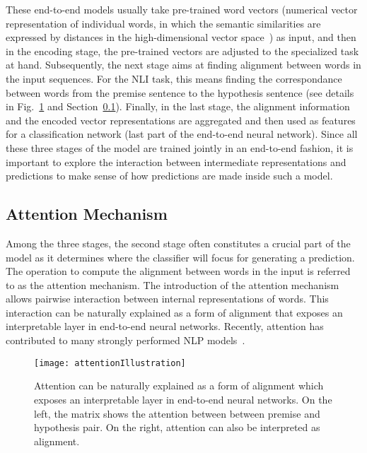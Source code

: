 These end-to-end models usually take pre-trained word vectors (numerical vector representation of individual words, in which the semantic similarities are expressed by distances in the high-dimensional vector space~\cite{MikolovSutskeverChen2013, PenningtonSocherManning2014}) as input, and then in the encoding stage, the pre-trained vectors are adjusted to the specialized task at hand. Subsequently, the next stage aims at finding alignment between words in the input sequences. For the NLI task, this means finding the correspondance between words from the premise sentence to the hypothesis sentence (see details in Fig.~\ref{fig:attention} and Section~\ref{sec:attention}). Finally, in the last stage, the alignment information and the encoded vector representations are aggregated and then used as features for a classification network (last part of the end-to-end neural network).
%
Since all these three stages of the model are trained jointly in an end-to-end fashion, it is important to explore the interaction between intermediate representations and predictions to make sense of how predictions are made inside such a model.

\subsection{Attention Mechanism}
\label{sec:attention}
Among the three stages, the second stage often constitutes a crucial part of the model as it determines where the classifier will focus for generating a prediction. The operation to compute the alignment between words in the input is referred to as the attention mechanism. 
The introduction of the attention mechanism~\cite{bahdanau2014neural} allows
pairwise interaction between internal representations of words. 
This interaction can be naturally explained as a form of alignment that exposes an interpretable layer in end-to-end neural networks.
%
Recently, attention has contributed to many strongly performed NLP models~\cite{parikh2016emnlp,rush2015neural,yang2016hierarchical,seo2016bidirectional,schwartz2017high}.

\begin{figure}[htbp]
\centering
\vspace{-2mm}
 \texttt{[image: attentionIllustration]}

 \caption{Attention can be naturally explained as a form of alignment which exposes an interpretable layer in end-to-end neural networks. On the left, the matrix shows the attention between between premise and hypothesis pair. On the right, attention can also be interpreted as alignment.}
\label{fig:attention}
\end{figure}


